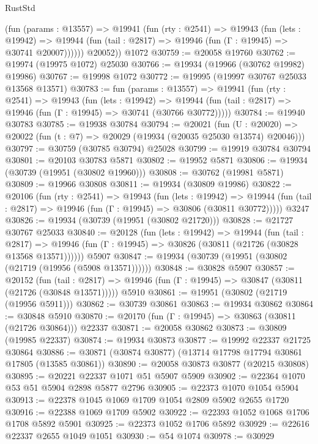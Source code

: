 \begin{lexlean}{RustStd}
\begin{coremodule}
          (fun (params : @13557) =>
          @19941
            (fun (rty : @2541) =>
            @19943
              (fun (lets : @19942) =>
              @19944 (fun (tail : @2817) => @19946 (fun (Γ : @19945) => @30741 @20007))))))
        @20052))
    @1072
@30759 := @20058 @19760
@30762 := @19974 (@19975 @1072) @25030
@30766 := @19934 (@19966 (@30762 @19982) @19986)
@30767 := @19998 @1072
@30772 := @19995 (@19997 @30767 @25033 @13568 @13571)
@30783 := fun (params : @13557) =>
  @19941
    (fun (rty : @2541) =>
    @19943
      (fun (lets : @19942) =>
      @19944 (fun (tail : @2817) => @19946 (fun (Γ : @19945) => @30741 (@30766 @30772)))))
@30784 := @19940 @30783
@30785 := @19938 @30784
@30794 := @20021
    (fun (U : @20020) => @20022 (fun (t : @7) => @20029 (@19934 (@20035 @25030 @13574) @20046)))
@30797 := @30759 (@30785 @30794) @25028
@30799 := @19919 @30784 @30794
@30801 := @20103 @30783 @5871
@30802 := @19952 @5871
@30806 := @19934 (@30739 (@19951 (@30802 @19960)))
@30808 := @30762 (@19981 @5871)
@30809 := @19966 @30808
@30811 := @19934 (@30809 @19986)
@30822 := @20106
    (fun (rty : @2541) =>
    @19943
      (fun (lets : @19942) =>
      @19944 (fun (tail : @2817) => @19946 (fun (Γ : @19945) => @30806 (@30811 @30772)))))
    @3247
@30826 := @19934 (@30739 (@19951 (@30802 @21720)))
@30828 := @21727 @30767 @25033
@30840 := @20128
    (fun (lets : @19942) =>
    @19944
      (fun (tail : @2817) =>
      @19946 (fun (Γ : @19945) => @30826 (@30811 (@21726 (@30828 @13568 @13571))))))
    @5907
@30847 := @19934 (@30739 (@19951 (@30802 (@21719 (@19956 (@5908 @13571))))))
@30848 := @30828 @5907
@30857 := @20152
    (fun (tail : @2817) => @19946 (fun (Γ : @19945) => @30847 (@30811 (@21726 (@30848 @13571)))))
    @5910
@30861 := @19951 (@30802 (@21719 (@19956 @5911)))
@30862 := @30739 @30861
@30863 := @19934 @30862
@30864 := @30848 @5910
@30870 := @20170 (fun (Γ : @19945) => @30863 (@30811 (@21726 @30864))) @22337
@30871 := @20058 @30862
@30873 := @30809 (@19985 @22337)
@30874 := @19934 @30873
@30877 := @19992 @22337 @21725 @30864
@30886 := @30871 (@30874 @30877) (@13714 @17798 @17794 @30861 @17805 (@13585 @30861))
@30890 := @20058 @30873 @30877 (@20215 @30808)
@30895 := @20221 @22337 @1071 @51 @5907 @5909
@30902 := @22364 @1070 @53 @51 @5904 @2898 @5877 @2796
@30905 := @22373 @1070 @1054 @5904
@30913 := @22378 @1045 @1069 @1709 @1054 @2809 @5902 @2655 @1720
@30916 := @22388 @1069 @1709 @5902
@30922 := @22393 @1052 @1068 @1706 @1708 @5892 @5901
@30925 := @22373 @1052 @1706 @5892
@30929 := @22616 @22337 @2655 @1049 @1051
@30930 := @54 @1074
@30978 := @30929

\end{coremodule}
\end{lexlean}
